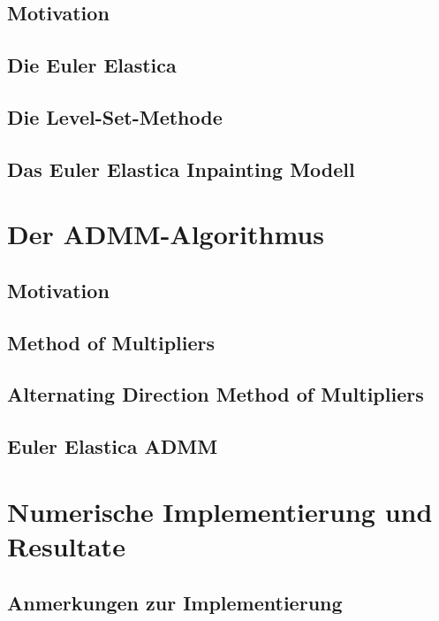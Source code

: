 \documentclass{mythesis}
\begin{document}
\section{Motivation} %

\section{Die Euler Elastica}

\section{Die Level-Set-Methode}

\section{Das Euler Elastica Inpainting Modell} %



\chapter{Der ADMM-Algorithmus}


\section{Motivation} %

\section{Method of Multipliers}

\section{Alternating Direction Method of Multipliers}

\section{Euler Elastica ADMM}



\chapter{Numerische Implementierung und Resultate}


\section{Anmerkungen zur Implementierung}
\end{document}
